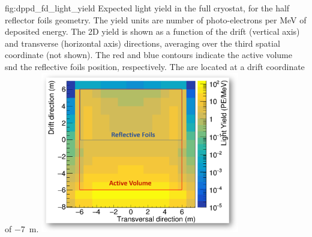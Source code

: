 \begin{dunefigure}{fig:dppd_fd_light_yield}
{Expected light yield in the full   cryostat, for the half  reflector foils geometry. The yield units are number of photo-electrons per \si{\MeV} of deposited energy. The 2D yield is shown as a function of the drift (vertical axis) and transverse (horizontal axis) directions, averaging over the third spatial coordinate (not shown). The red and blue contours indicate the  active volume snd the reflective foils position, respectively. The  are located at a drift coordinate of \SI{-7}{\m}.}
\includegraphics[width=0.65\textwidth]{graphics/dppd_PhotLibHalfFoil.png} 
\end{dunefigure}
